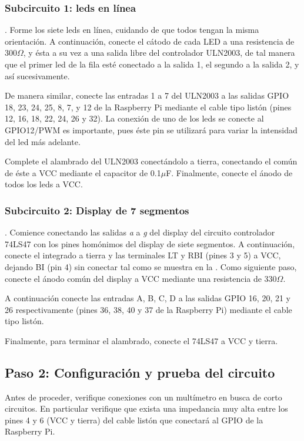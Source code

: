 \documentclass[letterpaper,10.5pt]{article}
\begin{document}
\subsubsection{Subcircuito 1: leds en línea}.
Forme los siete leds en línea, cuidando de que todos tengan la misma orientación. A continuación, conecte el cátodo de cada LED a una resistencia de 300$\Omega$, y ésta a su vez a una salida libre del controlador ULN2003, de tal manera que el primer led de la fila esté conectado a la salida 1, el segundo a la salida 2, y así sucesivamente.

De manera similar, conecte las entradas 1 a 7 del ULN2003 a las salidas GPIO 18, 23, 24, 25, 8, 7, y 12 de la Raspberry Pi mediante el cable tipo listón (pines 12, 16, 18, 22, 24, 26 y 32).
La conexión de uno de los leds se conecte al GPIO12/PWM es importante, pues éste pin se utilizará para variar la intensidad del led más adelante.

Complete el alambrado del ULN2003 conectándolo a tierra, conectando el común de éste a VCC mediante el capacitor de 0.1$\mu$F. Finalmente, conecte el ánodo de todos los leds a VCC.%

\subsubsection{Subcircuito 2: Display de 7 segmentos}.
Comience conectando las salidas \emph{a} a \emph{g} del display del circuito controlador 74LS47 con los pines homónimos del display de siete segmentos.
A continuación, conecte el integrado a tierra y las terminales LT y RBI (pines 3 y 5) a VCC, dejando BI (pin 4) sin conectar tal como se muestra en la .
Como siguiente paso, conecte el ánodo común del display a VCC mediante una resistencia de 330$\Omega$.

A continuación conecte las entradas A, B, C, D a las salidas GPIO 16, 20, 21 y 26 respectivamente (pines 36, 38, 40 y 37 de la Raspberry Pi) mediante el cable tipo listón.

Finalmente, para terminar el alambrado, conecte el 74LS47 a VCC y tierra.

%
%
\subsection{Paso 2: Configuración y prueba del circuito}%
\label{sec:step2}
Antes de proceder, verifique conexiones con un multímetro en busca de corto circuitos. En particular verifique que exista una impedancia muy alta entre los pines 4 y 6 (VCC y tierra) del cable listón que conectará al GPIO de la Raspberry Pi.
\end{document}
